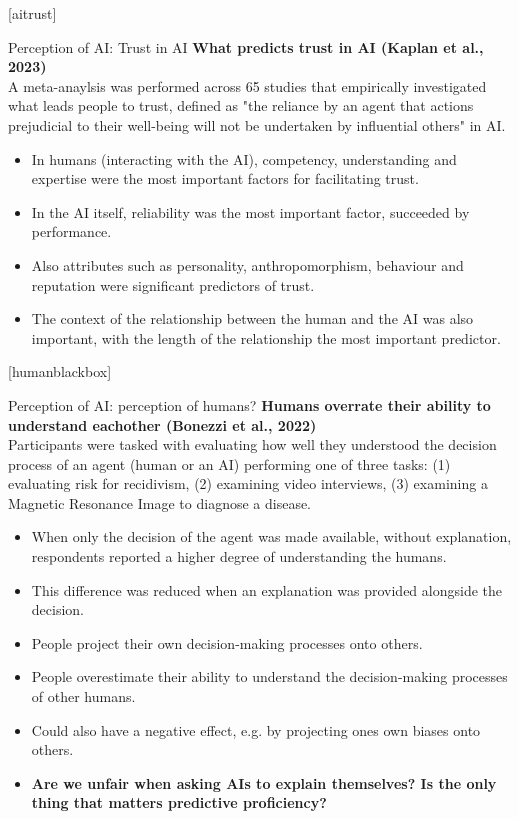 \documentclass[8pt]{beamer}
\begin{document}
	[aitrust]

	\begin{frame}[t]{Perception of AI: Trust in AI}
		\textbf{What predicts trust in AI (Kaplan et al., 2023)}\\
		A meta-anaylsis was performed across 65 studies that empirically investigated what leads people to trust, defined as "the reliance by an agent that actions prejudicial to their well-being will not be undertaken by influential others" in AI.
		\begin{itemize}
			\item In humans (interacting with the AI), competency, understanding and expertise were the most important factors for facilitating trust.
			\item In the AI itself, reliability was the most important factor, succeeded by performance.
			\item Also attributes such as personality, anthropomorphism, behaviour and reputation were significant predictors of trust.
			\item The context of the relationship between the human and the AI was also important, with the length of the relationship the most important predictor.
		\end{itemize}
	\end{frame}

	[humanblackbox]

	\begin{frame}[t]{Perception of AI: perception of humans?}
		\textbf{Humans overrate their ability to understand eachother (Bonezzi et al., 2022)}\\
		Participants were tasked with evaluating how well they understood the decision process of an agent (human or an AI) performing one of three tasks: (1) evaluating risk for recidivism, (2) examining video interviews, (3) examining a Magnetic Resonance Image to diagnose a disease.
		\begin{itemize}
			\item When only the decision of the agent was made available, without explanation, respondents reported a higher degree of understanding the humans.
			\item This difference was reduced when an explanation was provided alongside the decision.
			\item People project their own decision-making processes onto others.
			\item People overestimate their ability to understand the decision-making processes of other humans.
			\item Could also have a negative effect, e.g. by projecting ones own biases onto others.
			\item \textbf{Are we unfair when asking AIs to explain themselves? Is the only thing that matters predictive proficiency?}
		\end{itemize}
	\end{frame}
\end{document}

